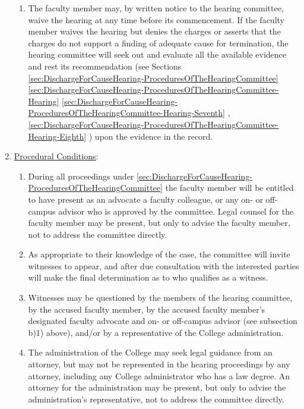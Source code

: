 \begin{enumerate}[label=\alph*)]
{\begin{enumerate}[label=\arabic*)]
								\item{The faculty member may, by written notice to the hearing committee, waive the hearing at any time before its commencement.  If the faculty member waives the hearing but denies the charges or asserts that the charges do not support a finding of adequate cause for termination, the hearing committee will seek out and evaluate all the available evidence and rest its recommendation
									(see
									Sections
									\ref{sec:DischargeForCauseHearing-ProceduresOfTheHearingCommittee}
									\ref{sec:DischargeForCauseHearing-ProceduresOfTheHearingCommittee-Hearing}
									\ref{sec:DischargeForCauseHearing-ProceduresOfTheHearingCommittee-Hearing-Seventh}
									,
									\ref{sec:DischargeForCauseHearing-ProceduresOfTheHearingCommittee-Hearing-Eighth}
									)
									upon the evidence in the record.}
							\end{enumerate}
						}
						\item{\underline{Procedural Conditions}:
							\label{sec:DischargeForCauseHearing-ProceduresOfTheHearingCommittee-ProceduralConditions}
							\begin{enumerate}[label=\arabic*)]
								\item{
									\label{sec:DischargeForCauseHearing-ProceduresOfTheHearingCommittee-ProceduralConditions-First}
									During all proceedings under
									\ref{sec:DischargeForCauseHearing-ProceduresOfTheHearingCommittee}
									the faculty member will be entitled to have present as an advocate a faculty colleague, or any on- or off-campus advisor who is approved by the committee.  Legal counsel for the faculty member may be present, but only to advise the faculty member, not to address the committee directly.}
								\item{As appropriate to their knowledge of the case, the committee will invite witnesses to appear, and after due consultation with the interested parties will make the final determination as to who qualifies as a witness.}
								\item{Witnesses may be questioned by the members of the hearing committee, by the accused faculty member, by the accused faculty member's designated faculty advocate and on- or off-campus advisor (see subsection b)1) above), and/or by a representative of the College administration.}
								\item{The administration of the College may seek legal guidance from an attorney, but may not be represented in the hearing proceedings by any attorney, including any College administrator who has a law degree.  An attorney for the administration may be present, but only to advise the administration's representative, not to address the committee directly.}

\end{enumerate}}
\end{enumerate}
